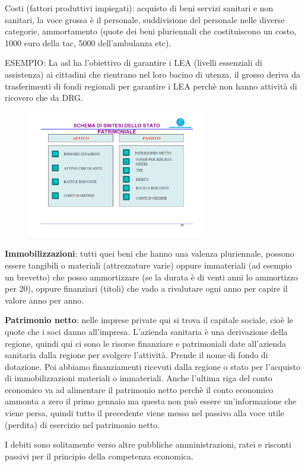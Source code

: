 Costi (fattori produttivi impiegati): acquisto di beni servizi sanitari
e non sanitari, la voce grossa è il personale, suddivisione del
personale nelle diverse categorie, ammortamento (quote dei beni
pluriennali che costituiscono un costo, 1000 euro della tac, 5000
dell'ambulanza etc).

ESEMPIO: La asl ha l'obiettivo di garantire i LEA (livelli essenziali di
assistenza) ai cittadini che rientrano nel loro bacino di utenza, il
grosso deriva da trasferimenti di fondi regionali per garantire i LEA
perchè non hanno attività di ricovero che da DRG.

\begin{figure}[!ht]
\centering
	\includegraphics[width=0.7\textwidth]{15/image1.png}
	\end{figure}

\textbf{Immobilizzazioni}: tutti quei beni che hanno una valenza
pluriennale, possono essere tangibili o materiali (attrezzature varie)
oppure immateriali (ad esempio un brevetto) che posso ammortizzare (se
la durata è di venti anni lo ammortizzo per 20), oppure finanziari
(titoli) che vado a rivalutare ogni anno per capire il valore anno per
anno.

\textbf{Patrimonio netto}: nelle imprese private qui si trova il
capitale sociale, cioè le quote che i soci danno all'impresa. L'azienda
sanitaria è una derivazione della regione, quindi qui ci sono le risorse
finanziare e patrimoniali date all'azienda sanitaria dalla regione per
svolgere l'attività. Prende il nome di fondo di dotazione. Poi abbiamo
finanziamenti ricevuti dalla regione o stato per l'acquisto di
immobilizzazioni materiali o immateriali. Anche l'ultima riga del conto
economico va ad alimentare il patrimonio netto perchè il conto economico
ammonta a zero il primo gennaio ma questa non può essere un'informazione
che viene persa, quindi tutto il precedente viene messo nel passivo alla
voce utile (perdita) di esercizio nel patrimonio netto.

I debiti sono solitamente verso altre pubbliche amministrazioni, ratei e
risconti passivi per il principio della competenza economica.
